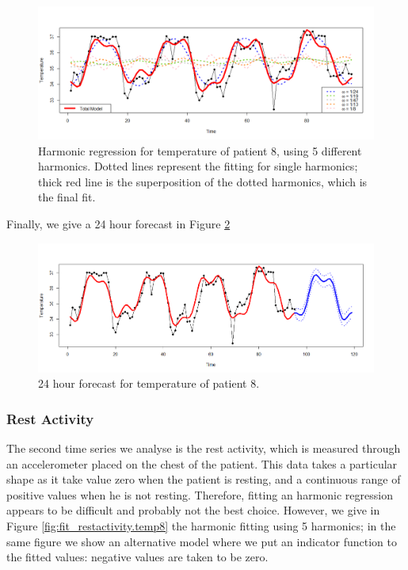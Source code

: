 \documentclass[]{article}
\begin{document}
\begin{figure}[htbp]\centering
	\includegraphics[scale = 0.37]{fitted_temp8.png}
	\caption{Harmonic regression for temperature of patient 8, using 5 different harmonics. Dotted lines represent the fitting for single harmonics; thick red line is the superposition of the dotted harmonics, which is the final fit.}
	\label{fig:fitted.Temp8}
\end{figure}

\vspace{1cm}
Finally, we give a 24 hour forecast in Figure \ref{fig:forecast.Temp8}

\begin{figure}[htbp]\centering
	\includegraphics[scale = 0.37]{forecasting_Temp8.png}
	\caption{24 hour forecast for temperature of patient 8.}
	\label{fig:forecast.Temp8}
\end{figure}



\subsubsection*{Rest Activity}
The second time series we analyse is the rest activity, which is measured through an accelerometer placed on the chest of the patient. This data takes a particular shape as it take value zero when the patient is resting, and a continuous range of positive values when he is not resting. Therefore, fitting an harmonic regression appears to be difficult and probably not the best choice. However, we give in  Figure \ref{fig:fit_restactivity.temp8} the harmonic fitting using 5 harmonics; in the same figure we show an alternative model where we put an indicator function to the fitted values: negative values are taken to be zero. 
\end{document}
